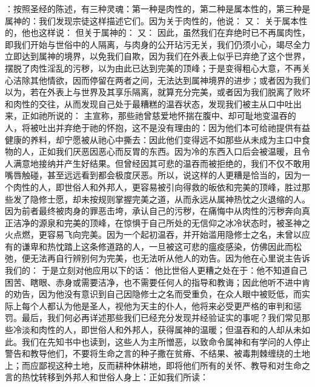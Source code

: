：按照圣经的陈述，有三种灵魂：第一种是肉性的，第二种是属本性的，第三种是属神的：我们发现宗徒这样描述它们。因为关于肉性的，他说： 又：  关于属本性的，他也这样说： 但关于属神的：  又：  因此，虽然我们在弃绝时已不再属肉性，即我们开始与世俗中的人隔离，与肉身的公开玷污无关，我们仍须小心，竭尽全力立即达到属神的境界，以免我们自欺，因为我们在外表上似乎已弃绝了这个世界，摆脱了肉性淫乱的污秽，以为由此已达到完美的顶峰；于是变得粗心大意，不再关心洁除其他情欲，因而停留在两者之间，无法达到属神境界的进步；或者因为我们以为，若在外表上与世界及其享乐隔离，就算充分完美，或者因为我们脱离了败坏和肉性的交往，从而发现自己处于最糟糕的温吞状态，发现我们被主从口中吐出来，正如祂所说的：  主宣称，那些祂曾慈爱地怀揣在腹中、却可耻地变温吞的人，将被吐出并弃绝于祂的怀抱，这不是没有理由的：因为他们本可给祂提供有益健康的养料，却宁愿被从祂心中撕去：因此他们变得远不如那些从未成为主口中食物的人，正如我们厌恶因恶心而反胃的东西。因为冷的东西入口后会被温暖，且令人满意地接纳并产生好结果。但曾经因其可悲的温吞而被拒绝的，我们不仅不敢用嘴唇触碰，甚至远远看到都会极度厌恶。所以，说这样的人更糟是恰当的，因为一个肉性的人，即世俗人和外邦人，更容易被引向得救的皈依和完美的顶峰，胜过那些发了隐修士愿，却未按规则掌握完美之道，从而永远从属神热忱之火退缩的人。因为前者最终被肉身的罪恶击垮，承认自己的污秽，在痛悔中从肉性的污秽奔向真正洁净的源泉和完美的顶峰，在惊惧于自己所处的无信仰之冰冷状态时，被圣神之火点燃，更容易飞向完美。因为一个起初温吞，并开始滥用隐修士之名，未曾以应有的谦卑和热忱踏上这条修道路的人，一旦被这可悲的瘟疫感染，仿佛因此而松弛，便无法再自行辨别何为完美，也无法听从他人的劝告。因为他在心里说主告诉我们的： 于是立刻对他应用以下的话：  他比世俗人更糟之处在于：他不知道自己困苦、瞎眼、赤身或需要洁净，也不需要任何人的指导和教诲；因此他听不进中肯的劝告，因为他没有意识到自己因隐修士之名而受重负，在众人眼中被贬低，而实际上每个人都认为他是圣人，视他为天主的仆人，他将来必受更严格的审判和惩罚。最后，我们何必再详述那些我们已经充分发现并经验证实的事呢？我们常见那些冷淡和肉性的人，即世俗人和外邦人，获得属神的温暖；但温吞和的人却从未如此。我们在先知书中也读到，这些人为主所憎恶，以致命令属神和有学问的人停止警告和教导他们，不要将生命之言的种子撒在贫瘠、不结果、被毒荆棘缠绕的土地上；而应鄙视这种土地，反而耕种休耕地，即将他们所有的关怀、教导和对生命之言的热忱转移到外邦人和世俗人身上：正如我们所读： \par

